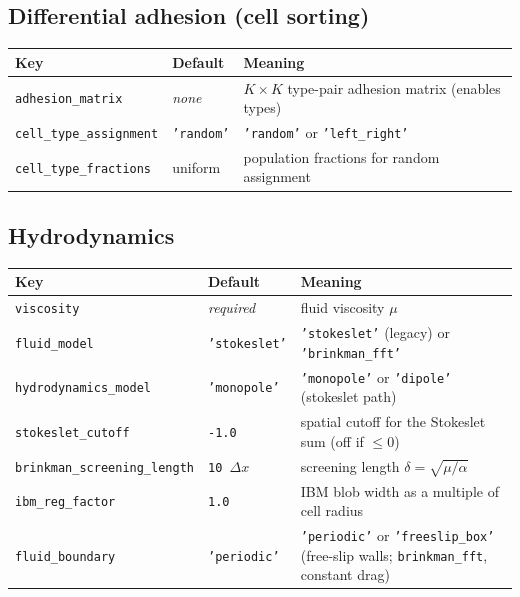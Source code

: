 \documentclass[11pt]{article}
\newcommand{\code}[1]{\texttt{#1}}
\begin{document}
\subsection{Differential adhesion (cell sorting)}
\begin{longtable}{p{} p{} p{}}
\toprule
Key & Default & Meaning \\ \midrule \endhead
\code{adhesion\_matrix} & \emph{none} & $K\times K$ type-pair adhesion matrix (enables types) \\
\code{cell\_type\_assignment} & \code{'random'} & \code{'random'} or \code{'left\_right'} \\
\code{cell\_type\_fractions} & uniform & population fractions for random assignment \\
\bottomrule
\end{longtable}

\subsection{Hydrodynamics}
\begin{longtable}{p{} p{} p{}}
\toprule
Key & Default & Meaning \\ \midrule \endhead
\code{viscosity} & \emph{required} & fluid viscosity $\mu$ \\
\code{fluid\_model} & \code{'stokeslet'} & \code{'stokeslet'} (legacy) or \code{'brinkman\_fft'} \\
\code{hydrodynamics\_model} & \code{'monopole'} & \code{'monopole'} or \code{'dipole'} (stokeslet path) \\
\code{stokeslet\_cutoff} & \code{-1.0} & spatial cutoff for the Stokeslet sum (off if $\le 0$) \\
\code{brinkman\_screening\_length} & \code{10\,$\Delta x$} & screening length $\delta=\sqrt{\mu/\alpha}$ \\
\code{ibm\_reg\_factor} & \code{1.0} & IBM blob width as a multiple of cell radius \\
\code{fluid\_boundary} & \code{'periodic'} & \code{'periodic'} or \code{'freeslip\_box'} (free-slip walls; \code{brinkman\_fft}, constant drag) \\
\bottomrule
\end{longtable}
\end{document}

